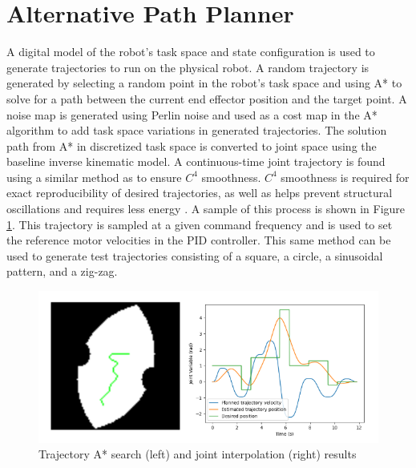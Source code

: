 \section{Alternative Path Planner}
\label{app:path_planner}

A digital model of the robot's task space and state configuration is used to generate trajectories to run on the physical robot. A random trajectory is generated by selecting a random point in the robot's task space and using A* to solve for a path between the current end effector position and the target point. A noise map is generated using Perlin noise \cite{perlin_noise} and used as a cost map in the A* algorithm to add task space variations in generated trajectories. The solution path from A* in discretized task space is converted to joint space using the baseline inverse kinematic model. A continuous-time joint trajectory is found using a similar method as \cite{8772208} to ensure $C^4$ smoothness. $C^4$ smoothness is required for exact reproducibility of desired trajectories, as well as helps prevent structural oscillations and requires less energy \cite{8772208}. A sample of this process is shown in Figure \ref{fig:trajectory_generation}. This trajectory is sampled at a given command frequency and is used to set the reference motor velocities in the PID controller. This same method can be used to generate test trajectories consisting of a square, a circle, a sinusoidal pattern, and a zig-zag. 

\begin{figure}[h]
    \centering
    \includegraphics[width=\textwidth]{images/trajectory_generation.png}
    \caption{Trajectory A* search (left) and joint interpolation (right) results}
    \label{fig:trajectory_generation}
\end{figure}